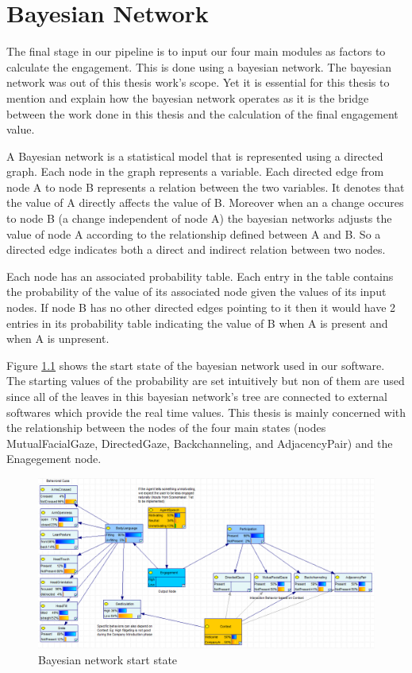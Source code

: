 \documentclass[12pt, a4paper, fleqn]{memoir}%
\begin{document}
\chapter{Bayesian Network}
\label{chap:BayesianNetwork}
The final stage in our pipeline is to input our four main modules as factors to calculate the engagement. This is done using a bayesian network. The bayesian network was out of this thesis work's scope. Yet it is essential for this thesis to mention and explain how the bayesian network operates as it is the bridge between the work done in this thesis and the calculation of the final engagement value.

A Bayesian network is a statistical model that is represented using a directed graph. Each node in the graph represents a variable. Each directed edge from node A to node B represents a relation between the two variables. It denotes that the value of A directly affects the value of B. Moreover when an a change occures to node B (a change independent of node A) the bayesian networks adjusts the value of node A according to the relationship defined between A and B. So a directed edge indicates both a direct and indirect relation between two nodes.

Each node has an associated probability table. Each entry in the table contains the probability of the value of its associated node given the values of its input nodes. If node B has no other directed edges pointing to it then it would have 2 entries in its probability table indicating the value of B when A is present and when A is unpresent.

Figure \ref{fig:BN_start_state_img} shows the start state of the bayesian network used in our software. The starting values of the probability are set intuitively but non of them are used since all of the leaves in this bayesian network's tree are connected to external softwares which provide the real time values. This thesis is mainly concerned with the relationship between the nodes of the four main states (nodes MutualFacialGaze, DirectedGaze, Backchanneling, and AdjacencyPair) and the Enagegement node.

\begin{figure}[h!]
    \centering
    \includegraphics[width=1\textwidth]{BN_start_state}
    \caption{Bayesian network start state}
    \label{fig:BN_start_state_img}
\end{figure}
\end{document}
